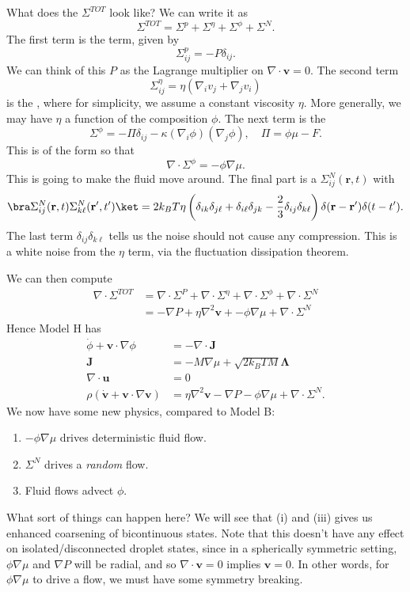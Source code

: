 \documentclass[a4paper]{article}
\begin{document}
What does the $\Sigma^{TOT}$ look like? We can write it as
\[
  \Sigma^{TOT} = \Sigma^p + \Sigma^\eta + \Sigma^\phi + \Sigma^N.
\]
The first term is the  term, given by
\[
  \Sigma_{ij}^p = - P \delta_{ij}.
\]
We can think of this $P$ as the Lagrange multiplier on $\nabla \cdot \mathbf{v} = 0$. The second term
\[
  \Sigma_{ij}^\eta = \eta (\nabla_i v_j + \nabla_j v_i)
\]
is the , where for simplicity, we assume a constant viscosity $\eta$. More generally, we may have $\eta$ a function of the composition $\phi$. The next term is the 
\[
  \Sigma^\phi = - \Pi \delta_{ij} - \kappa (\nabla_i \phi) (\nabla_j \phi),\quad \Pi = \phi \mu - F.
\]
This is of the form so that
\[
  \nabla \cdot \Sigma^\phi = - \phi \nabla \mu.
\]
This is going to make the fluid move around. The final part is a  $\Sigma_{ij}^N (\mathbf{r}, t)$ with
\[
  \bra \Sigma_{ij}^N (\mathbf{r}, t) \Sigma_{k\ell}^N (\mathbf{r}', t')\ket = 2k_B T \eta \left(\delta_{ik} \delta_{j\ell} + \delta_{i\ell} \delta_{jk} - \frac{2}{3} \delta_{ij} \delta_{k\ell}\right) \delta(\mathbf{r} - \mathbf{r}') \delta(t - t').
\]
The last term $\delta_{ij} \delta_{k\ell}$ tells us the noise should not cause any compression. This is a white noise from the $\eta$ term, via the fluctuation dissipation theorem.

We can then compute
\begin{align*}
  \nabla \cdot \Sigma^{TOT} &= \nabla \cdot \Sigma^P + \nabla \cdot \Sigma^\eta + \nabla \cdot \Sigma^\phi + \nabla \cdot \Sigma^N\\
  &= - \nabla P + \eta \nabla^2 \mathbf{v} + - \phi \nabla \mu + \nabla \cdot \Sigma^N
\end{align*}
Hence Model H has 
\begin{align*}
  \dot{\phi} + \mathbf{v} \cdot \nabla \phi &=- \nabla \cdot \mathbf{J}\\
  \mathbf{J} &= -M \nabla \mu + \sqrt{2k_B T M} \boldsymbol\Lambda\\
  \nabla \cdot \mathbf{u} &= 0\\
  \rho (\dot{\mathbf{v}} + \mathbf{v} \cdot \nabla \mathbf{v}) &= \eta \nabla^2 \mathbf{v} - \nabla P - \phi \nabla \mu + \nabla \cdot \Sigma^N.
\end{align*}
We now have some new physics, compared to Model B:
\begin{enumerate}
  \item $-\phi\nabla \mu$ drives deterministic fluid flow.
  \item $\Sigma^N$ drives a \emph{random} flow.
  \item Fluid flows advect $\phi$.
\end{enumerate}
What sort of things can happen here? We will see that (i) and (iii) gives us enhanced coarsening of bicontinuous states. Note that this doesn't have any effect on isolated/disconnected droplet states, since in a spherically symmetric setting, $\phi \nabla \mu$ and $\nabla P$ will be radial, and so $\nabla \cdot \mathbf{v} = 0$ implies $\mathbf{v} = 0$. In other words, for $\phi \nabla \mu$ to drive a flow, we must have some symmetry breaking.
\end{document}
